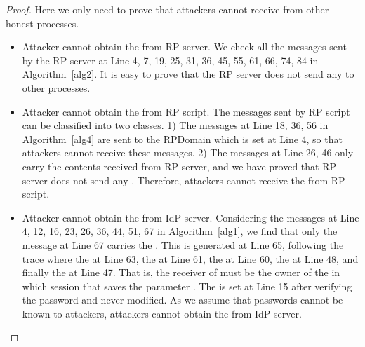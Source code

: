 \begin{proof}
Here we only need to prove that attackers cannot receive  from other honest processes.
\begin{itemize}
\setlength\itemsep{-2pt}
\item Attacker cannot obtain the  from RP server.  We check all the messages sent by the RP server at Line 4, 7, 19, 25, 31, 36, 45, 55, 61, 66, 74, 84 in Algorithm~\ref{alg2}. It is easy to prove that the RP server does not send any  to other processes.
\item Attacker cannot obtain the  from RP script. The  messages sent by RP script can be classified into two classes. 1) The messages at Line 18, 36, 56 in Algorithm~\ref{alg4}  are sent to the RPDomain which is set at Line 4, so that attackers cannot receive these messages. 2) The messages at Line 26,  46 only carry the contents received from RP server, and we have proved that RP server does not send any . Therefore, attackers cannot receive the  from RP script.
\item Attacker cannot obtain the  from IdP server.  Considering the messages at Line 4, 12, 16, 23, 26, 36, 44, 51, 67 in Algorithm~\ref{alg1}, we find that only the message at Line 67 carries the . This  is generated at Line 65, following the trace where the  at Line 63, the  at Line 61, the  at Line 60, the  at Line 48, and finally the  at Line 47. That is, the receiver of   must be the owner of the  in which session that saves the parameter  . The  is set at Line 15 after verifying the password and never modified. As we assume that passwords cannot be known to attackers,  attackers cannot obtain the  from IdP server.

\end{itemize}
\end{proof}
